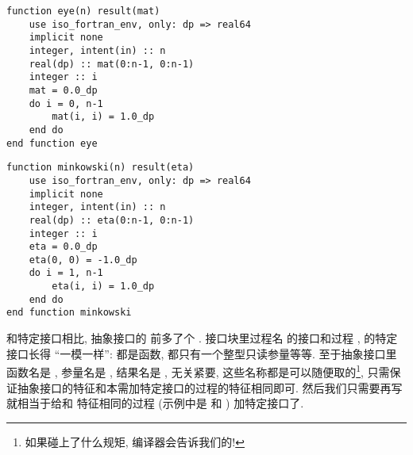 \begin{lstlisting}
function eye(n) result(mat)
    use iso_fortran_env, only: dp => real64
    implicit none
    integer, intent(in) :: n
    real(dp) :: mat(0:n-1, 0:n-1)
    integer :: i
    mat = 0.0_dp
    do i = 0, n-1
        mat(i, i) = 1.0_dp
    end do
end function eye
\end{lstlisting}
\begin{lstlisting}
function minkowski(n) result(eta)
    use iso_fortran_env, only: dp => real64
    implicit none
    integer, intent(in) :: n
    real(dp) :: eta(0:n-1, 0:n-1)
    integer :: i
    eta = 0.0_dp
    eta(0, 0) = -1.0_dp
    do i = 1, n-1
        eta(i, i) = 1.0_dp
    end do
end function minkowski
\end{lstlisting} 
和特定接口相比, 抽象接口的  前多了个 . 接口块里过程名  的接口和过程 ,  的特定接口长得 ``一模一样'': 都是函数, 都只有一个整型只读参量等等. 至于抽象接口里函数名是 , 参量名是 , 结果名是 , 无关紧要, 这些名称都是可以随便取的\footnote{如果碰上了什么规矩, 编译器会告诉我们的!}, 只需保证抽象接口的特征和本需加特定接口的过程的特征相同即可. 然后我们只需要再写  就相当于给和  特征相同的过程  (示例中是  和 ) 加特定接口了.
